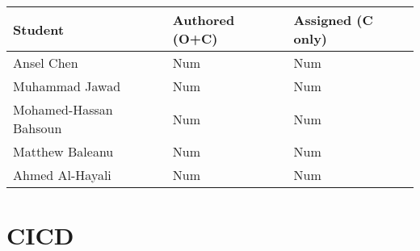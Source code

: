 \documentclass{article}
\begin{document}

\begin{table}[H]
\centering
\begin{tabular}{lll}
\toprule
\textbf{Student} & \textbf{Authored (O+C)} & \textbf{Assigned (C only)}\\
\midrule
Ansel Chen & Num & Num \\
Muhammad Jawad & Num & Num \\
Mohamed-Hassan Bahsoun & Num & Num \\
Matthew Baleanu & Num & Num \\
Ahmed Al-Hayali & Num & Num \\
\bottomrule
\end{tabular}
\end{table}


\section{CICD}


\end{document}
